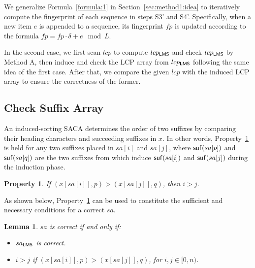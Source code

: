 \documentclass[10pt,journal,compsoc]{IEEEtran}
\newtheorem{Lemma}{Lemma}
\newtheorem{Property}{Property}
\begin{document}
	We generalize Formula~\ref{formula:1} in Section~\ref{sec:method1:idea} to iteratively compute the fingerprint of each sequence in steps S3' and S4'. Specifically, when a new item $e$ is appended to a sequence, its fingerprint $fp$ is updated according to the formula $fp = fp \cdot \delta + e \mod L$.
	
	\vspace{1ex}  In the second case, we first scan $lcp$ to compute $lcp_{\sf LMS}$ and check $lcp_{\sf LMS}$ by Method A, then induce and check the LCP array from $lcp_{\sf LMS}$ following the same idea of the first case. After that, we compare the given $lcp$ with the induced LCP array to ensure the correctness of the former.
	
	\subsection{Check Suffix Array} \label{sec:method2:check_sa}
	
	An induced-sorting SACA determines the order of two suffixes by comparing their heading characters and succeeding suffixes in $x$. In other words, Property~\ref{property:3} is held for any two suffixes placed in $sa[i]$ and $sa[j]$, where ${\sf suf}(sa[p])$ and ${\sf suf}(sa[q])$ are the two suffixes from which induce ${\sf suf}(sa[i])$ and ${\sf suf}(sa[j])$ during the induction phase.
	
	\begin{Property} \label{property:3}
		If $(x[sa[i]], p) > (x[sa[j]], q)$, then $i > j$.
		
	\end{Property}
	
	As shown below, Property~\ref{property:3} can be used to constitute the sufficient and necessary conditions for a correct $sa$.
	
	\begin{Lemma} \label{lemma:3}
		$sa$ is correct if and only if:
		
		\begin{itemize}
			\item [(1)] $sa_{\sf LMS}$ is correct.
			
			\item [(2)] $i > j$ if $(x[sa[i]], p) > (x[sa[j]], q)$, for $i, j \in [0, n)$.
			
		\end{itemize}
		
	\end{Lemma}
	
\end{document}
